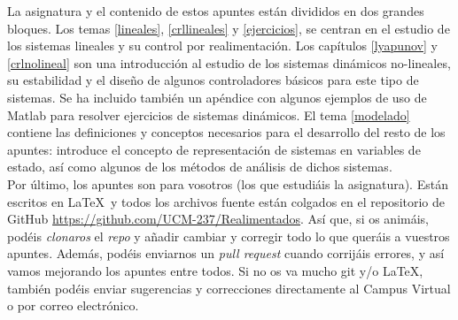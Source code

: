 La asignatura y el contenido de estos apuntes están divididos en dos grandes bloques. Los temas \ref{lineales}, \ref{crllineales} y \ref{ejercicios}, se centran en el estudio de los sistemas lineales y su control por realimentación.   Los capítulos \ref{lyapunov} y \ref{crlnolineal} son una introducción al estudio de los sistemas dinámicos no-lineales, su estabilidad y el diseño de algunos controladores básicos para este tipo de sistemas. Se ha incluido también un apéndice con algunos ejemplos de uso de Matlab para resolver ejercicios de sistemas dinámicos. El tema \ref{modelado} contiene las definiciones y conceptos necesarios para el desarrollo del resto de los apuntes: introduce el concepto de representación de sistemas en variables de estado, así como algunos de los métodos de análisis de dichos sistemas. \\

Por último, los apuntes son para vosotros (los que estudiáis la asignatura). Están escritos en \LaTeX\ y todos los archivos fuente están colgados en el repositorio de GitHub \url{https://github.com/UCM-237/Realimentados}. Así que, si os animáis, podéis \emph{clonaros} el \emph{repo} y añadir cambiar y corregir todo lo que queráis a vuestros apuntes. Además, podéis enviarnos un \emph{pull request} cuando corrijáis errores, y así vamos mejorando los apuntes entre todos. Si no os va mucho git y/o \LaTeX, también podéis enviar sugerencias y correcciones directamente al Campus Virtual o por correo electrónico.


